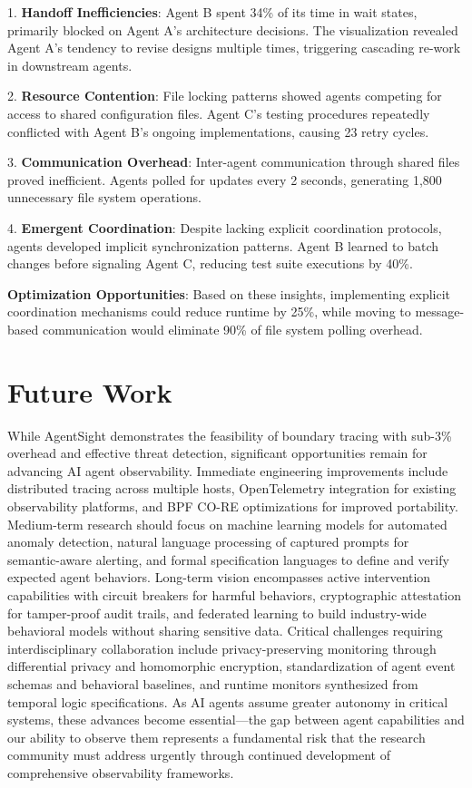 1. \textbf{Handoff Inefficiencies}: Agent B spent 34\% of its time in wait states, primarily blocked on Agent A's architecture decisions. The visualization revealed Agent A's tendency to revise designs multiple times, triggering cascading re-work in downstream agents.

2. \textbf{Resource Contention}: File locking patterns showed agents competing for access to shared configuration files. Agent C's testing procedures repeatedly conflicted with Agent B's ongoing implementations, causing 23 retry cycles.

3. \textbf{Communication Overhead}: Inter-agent communication through shared files proved inefficient. Agents polled for updates every 2 seconds, generating 1,800 unnecessary file system operations.

4. \textbf{Emergent Coordination}: Despite lacking explicit coordination protocols, agents developed implicit synchronization patterns. Agent B learned to batch changes before signaling Agent C, reducing test suite executions by 40\%.

\textbf{Optimization Opportunities}: Based on these insights, implementing explicit coordination mechanisms could reduce runtime by 25\%, while moving to message-based communication would eliminate 90\% of file system polling overhead.


\section{Future Work}

While AgentSight demonstrates the feasibility of boundary tracing with sub-3\% overhead and effective threat detection, significant opportunities remain for advancing AI agent observability. Immediate engineering improvements include distributed tracing across multiple hosts, OpenTelemetry integration for existing observability platforms, and BPF CO-RE optimizations for improved portability. Medium-term research should focus on machine learning models for automated anomaly detection, natural language processing of captured prompts for semantic-aware alerting, and formal specification languages to define and verify expected agent behaviors. Long-term vision encompasses active intervention capabilities with circuit breakers for harmful behaviors, cryptographic attestation for tamper-proof audit trails, and federated learning to build industry-wide behavioral models without sharing sensitive data. Critical challenges requiring interdisciplinary collaboration include privacy-preserving monitoring through differential privacy and homomorphic encryption, standardization of agent event schemas and behavioral baselines, and runtime monitors synthesized from temporal logic specifications. As AI agents assume greater autonomy in critical systems, these advances become essential—the gap between agent capabilities and our ability to observe them represents a fundamental risk that the research community must address urgently through continued development of comprehensive observability frameworks.


